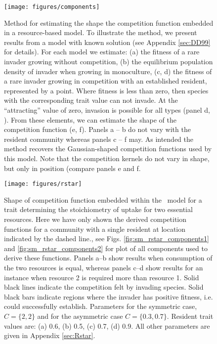 \documentclass[a4paper,11pt]{article}
\begin{document}
\begin{figure}[h]
 \centering
 \texttt{[image: figures/components]}
 \caption{Method for estimating the shape the competition function
   embedded in a resource-based model. To illustrate the
   method, we present results from a model with known solution
   \citep{Dieckmann-1999} (see Appendix \ref{sec:DD99} for
   details). For each model we estimate: (a) the fitness of a rare
   invader growing without competition, (b) the equilibrium population
   density of invader when growing in monoculture, (c, d) the fitness
   of a rare invader growing in competition with an established
   resident, represented by a point.  Where fitness is less than zero,
   then species with the corresponding trait value can not invade.  At
   the ``attracting'' value of zero, invasion is possible for all
   types (panel d, \citealt{Dieckmann-1999}).  From these elements, we
   can estimate the shape of the competition function (e, f).  Panels
   a -- b do not vary with the resident community whereas panels c --
   f may.
   As intended the method recovers the Gaussian-shaped competition
   functions used by this model.  Note that the competition kernels do
   not vary in shape, but only in position (compare panels e and f.}
  \label{fig:components}
\end{figure}

\begin{figure}[h]
  \centering
  \texttt{[image: figures/rstar]}
  \caption{Shape of competition function embedded within the \Rstar\ model
  for a trait determining the stoichiometry of uptake for two essential resources.
  Here we have only shown the derived  competition functions for a
  community with a single resident at location indicated by the dashed line., see Figs.
  \ref{fig:sm_rstar_components1} and \ref{fig:sm_rstar_components2} for plot of all
  components used to derive these functions.
  Panels a--b show results when consumption of the two resources is equal, whereas
  panels c--d show results for an instance when resource 2 is required more than
  resource 1.
  Solid black lines indicate the competition felt by invading species. Solid
  black bars indicate regions where the invader has positive fitness, i.e.
  could successfully establish. Parameters for the symmetric case, $C = \{2, 2\}$ and 
  for the asymmetric case $C = \{0.3, 0.7\}$. Resident
  trait values are: (a) 0.6, (b) 0.5, (c) 0.7, (d) 0.9. All other parameters
  are given in Appendix \ref{sec:Rstar}.}
  \label{fig:Rstar}
\end{figure}
\end{document}
